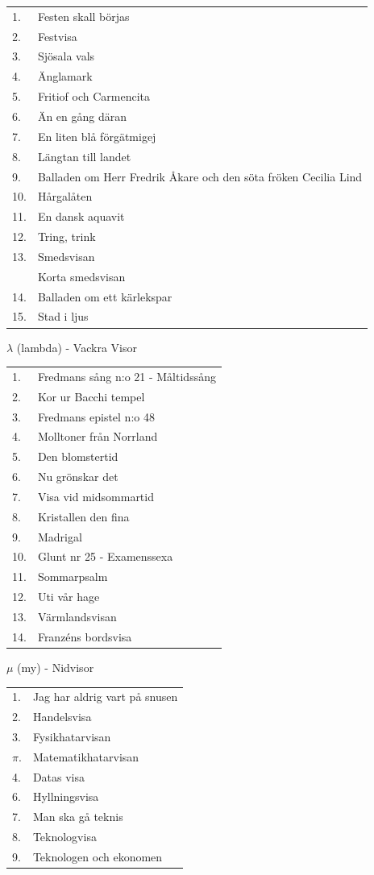 \documentclass[a6paper,10pt]{article}
\begin{document}
\noindent
\normalsize
\begin{tabularx}{1\textwidth}{l X}
1.&Festen skall börjas\\
2.&Festvisa\\
3.&Sjösala vals\\
4.&Änglamark\\
5.&Fritiof och Carmencita\\
6.&Än en gång däran\\
7.&En liten blå förgätmigej\\
8.&Längtan till landet\\
9.&Balladen om Herr Fredrik Åkare och den söta fröken Cecilia
Lind\\
10.&Hårgalåten\\
11.&En dansk aquavit\\
12.&Tring, trink\\
13.&Smedsvisan\\
&Korta smedsvisan\\
14.&Balladen om ett kärlekspar\\
15.&Stad i ljus
\end{tabularx}

\newpage

\noindent \Large $\lambda$ (lambda) - Vackra Visor

\noindent
\normalsize
\begin{tabularx}{1\textwidth}{l X}
1.&Fredmans sång n:o 21 - Måltidssång\\
2.&Kor ur Bacchi tempel\\
3.&Fredmans epistel n:o 48\\
4.&Molltoner från Norrland\\
5.&Den blomstertid\\
6.&Nu grönskar det \\
7.&Visa vid midsommartid\\
8.&Kristallen den fina\\
9.&Madrigal\\
10.&Glunt nr 25 - Examenssexa\\
11.&Sommarpsalm\\
12.&Uti vår hage\\
13.&Värmlandsvisan\\
14.&Franzéns bordsvisa
\end{tabularx}

\vspace{5pt}

\noindent \Large $\mu$ (my) - Nidvisor

\noindent
\normalsize
\begin{tabularx}{1\textwidth}{l X}
1.&Jag har aldrig vart på snusen\\
2.&Handelsvisa\\
3.&Fysikhatarvisan\\
$\pi$.&Matematikhatarvisan\\
4.&Datas visa\\
6.&Hyllningsvisa\\
7.&Man ska gå teknis \\
8.&Teknologvisa\\
9.&Teknologen och ekonomen
\end{tabularx}
\end{document}
